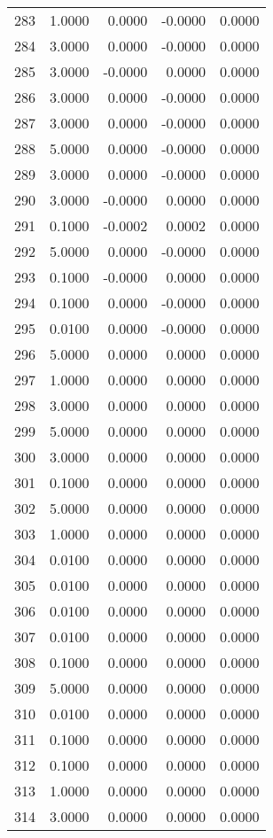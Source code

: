 \begin{longtable}{lrrrr}
283 & 1.0000 & 0.0000 & -0.0000 & 0.0000 \\
284 & 3.0000 & 0.0000 & -0.0000 & 0.0000 \\
285 & 3.0000 & -0.0000 & 0.0000 & 0.0000 \\
286 & 3.0000 & 0.0000 & -0.0000 & 0.0000 \\
287 & 3.0000 & 0.0000 & -0.0000 & 0.0000 \\
288 & 5.0000 & 0.0000 & -0.0000 & 0.0000 \\
289 & 3.0000 & 0.0000 & -0.0000 & 0.0000 \\
290 & 3.0000 & -0.0000 & 0.0000 & 0.0000 \\
291 & 0.1000 & -0.0002 & 0.0002 & 0.0000 \\
292 & 5.0000 & 0.0000 & -0.0000 & 0.0000 \\
293 & 0.1000 & -0.0000 & 0.0000 & 0.0000 \\
294 & 0.1000 & 0.0000 & -0.0000 & 0.0000 \\
295 & 0.0100 & 0.0000 & -0.0000 & 0.0000 \\
296 & 5.0000 & 0.0000 & 0.0000 & 0.0000 \\
297 & 1.0000 & 0.0000 & 0.0000 & 0.0000 \\
298 & 3.0000 & 0.0000 & 0.0000 & 0.0000 \\
299 & 5.0000 & 0.0000 & 0.0000 & 0.0000 \\
300 & 3.0000 & 0.0000 & 0.0000 & 0.0000 \\
301 & 0.1000 & 0.0000 & 0.0000 & 0.0000 \\
302 & 5.0000 & 0.0000 & 0.0000 & 0.0000 \\
303 & 1.0000 & 0.0000 & 0.0000 & 0.0000 \\
304 & 0.0100 & 0.0000 & 0.0000 & 0.0000 \\
305 & 0.0100 & 0.0000 & 0.0000 & 0.0000 \\
306 & 0.0100 & 0.0000 & 0.0000 & 0.0000 \\
307 & 0.0100 & 0.0000 & 0.0000 & 0.0000 \\
308 & 0.1000 & 0.0000 & 0.0000 & 0.0000 \\
309 & 5.0000 & 0.0000 & 0.0000 & 0.0000 \\
310 & 0.0100 & 0.0000 & 0.0000 & 0.0000 \\
311 & 0.1000 & 0.0000 & 0.0000 & 0.0000 \\
312 & 0.1000 & 0.0000 & 0.0000 & 0.0000 \\
313 & 1.0000 & 0.0000 & 0.0000 & 0.0000 \\
314 & 3.0000 & 0.0000 & 0.0000 & 0.0000 \\

\end{longtable}
